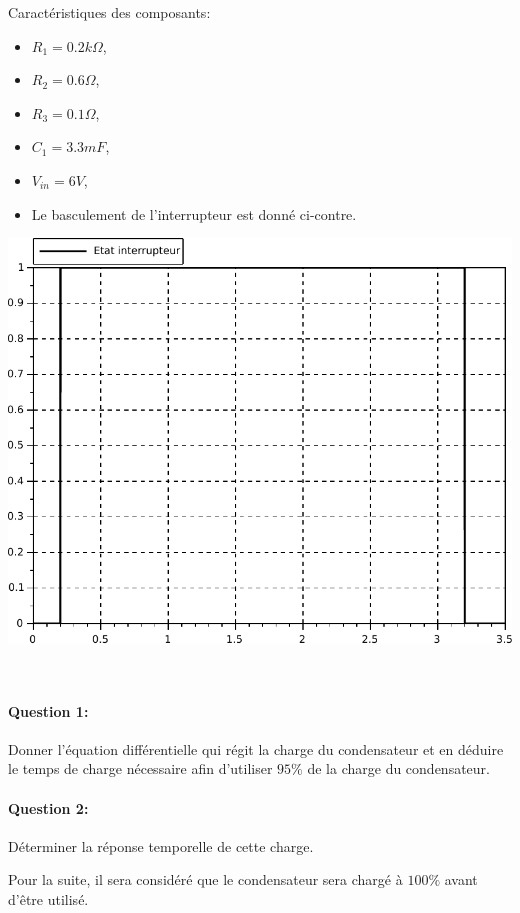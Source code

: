 \begin{minipage}{0.4\linewidth}
Caractéristiques des composants:
\begin{itemize}
 \item $R_{1}=0.2k\Omega$,
 \item $R_{2}=0.6\Omega$,
 \item $R_{3}=0.1\Omega$,
 \item $C_{1}=3.3mF$,
 \item $V_{in}=6V$,
 \item Le basculement de l'interrupteur est donné ci-contre.
\end{itemize}
\end{minipage}
 \hfill
\begin{minipage}{0.59\linewidth}
	\begin{center}
	\includegraphics[width=0.8\linewidth]{img/Interrupteur}
	\end{center}
\end{minipage}

~\

\paragraph{Question 1:} Donner l'équation différentielle qui régit la charge du condensateur et en déduire le temps de charge nécessaire afin d'utiliser $95\%$ de la charge du condensateur.

\paragraph{Question 2:} Déterminer la réponse temporelle de cette charge.
 
Pour la suite, il sera considéré que le condensateur sera chargé à $100\%$ avant d'être utilisé.

